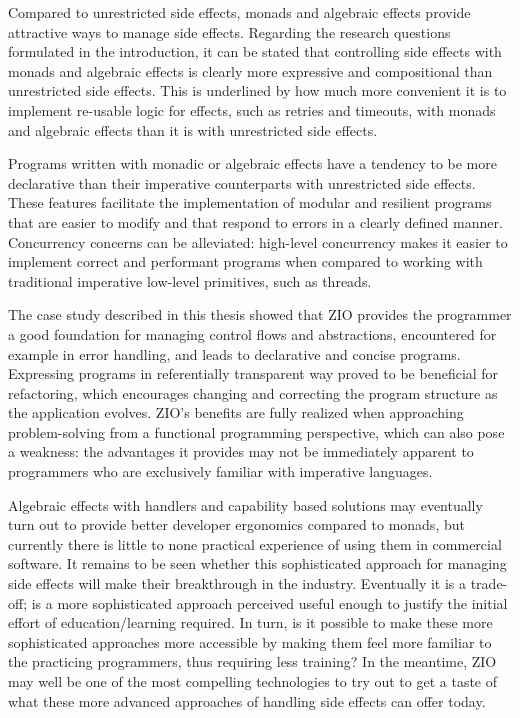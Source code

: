 Compared to unrestricted side effects, monads and algebraic effects provide attractive ways to manage side effects. Regarding the research questions formulated in the introduction, it can be stated that controlling side effects with monads and algebraic effects is clearly more expressive and compositional than unrestricted side effects. This is underlined by how much more convenient it is to implement re-usable logic for effects, such as retries and timeouts, with monads and algebraic effects than it is with unrestricted side effects.

Programs written with monadic or algebraic effects have a tendency to be more declarative than their imperative counterparts with unrestricted side effects. These features facilitate the implementation of modular and resilient programs that are easier to modify and that respond to errors in a clearly defined manner. Concurrency concerns can be alleviated: high-level concurrency makes it easier to implement correct and performant programs when compared to working with traditional imperative low-level primitives, such as threads.

The case study described in this thesis showed that ZIO provides the programmer a good foundation for managing control flows and abstractions, encountered for example in error handling, and leads to declarative and concise programs. Expressing programs in referentially transparent way proved to be beneficial for refactoring, which encourages changing and correcting the program structure as the application evolves. ZIO's benefits are fully realized when approaching problem-solving from a functional programming perspective, which can also pose a weakness: the advantages it provides may not be immediately apparent to programmers who are exclusively familiar with imperative languages.

Algebraic effects with handlers and capability based solutions may eventually turn out to provide better developer ergonomics compared to monads, but currently there is little to none practical experience of using them in commercial software. It remains to be seen whether this sophisticated approach for managing side effects will make their breakthrough in the industry. Eventually it is a trade-off; is a more sophisticated approach perceived useful enough to justify the initial effort of education/learning required. In turn, is it possible to make these more sophisticated approaches more accessible by making them feel more familiar to the practicing programmers, thus requiring less training? In the meantime, ZIO may well be one of the most compelling technologies to try out to get a taste of what these more advanced approaches of handling side effects can offer today.
